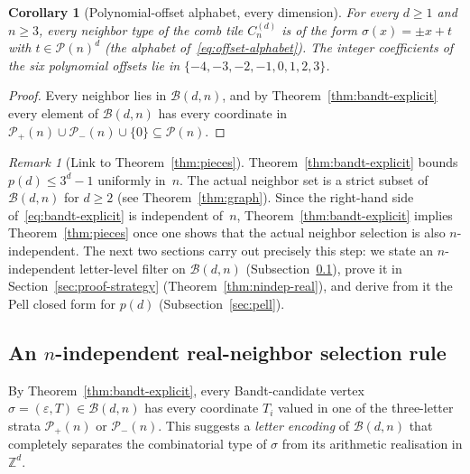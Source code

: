 \documentclass{amsart}
\newtheorem{corollary}[theorem]{Corollary}
\theoremstyle{definition}
\theoremstyle{remark}
\newtheorem{remark}[theorem]{Remark}
\newcommand{\Z}{\mathbb{Z}}
\begin{document}
\begin{corollary}[Polynomial-offset alphabet, every dimension]
\label{cor:poly-offsets}
For every $d \ge 1$ and $n \ge 3$, every neighbor type of the
comb tile $C_n^{(d)}$ is of the form $\sigma(x) = \pm x + t$
with $t \in \mathcal{P}(n)^d$ (the alphabet
of~\eqref{eq:offset-alphabet}).  The integer coefficients of
the six polynomial offsets lie in $\{-4, -3, -2, -1, 0, 1, 2, 3\}$.
\end{corollary}

\begin{proof}
Every neighbor lies in $\mathcal{B}(d, n)$, and by
Theorem~\ref{thm:bandt-explicit} every element of
$\mathcal{B}(d, n)$ has every coordinate in
$\mathcal{P}_+(n) \cup \mathcal{P}_-(n) \cup \{0\}
\subseteq \mathcal{P}(n)$.
\end{proof}

\begin{remark}[Link to Theorem~\ref{thm:pieces}]
\label{rem:bandt-link}
Theorem~\ref{thm:bandt-explicit} bounds $p(d) \le 3^d - 1$
uniformly in~$n$.  The actual neighbor set is a strict subset of
$\mathcal{B}(d, n)$ for $d \ge 2$
(see Theorem~\ref{thm:graph}).
Since the right-hand side of~\eqref{eq:bandt-explicit} is
independent of~$n$, Theorem~\ref{thm:bandt-explicit} implies
Theorem~\ref{thm:pieces} once one shows that
the actual neighbor selection is also $n$-independent.
The next two sections carry out precisely this step: we state an
$n$-independent letter-level filter on $\mathcal{B}(d, n)$
\textup{(}Subsection~\ref{sec:nindep-real}\textup{)}, prove it in
Section~\ref{sec:proof-strategy}
\textup{(}Theorem~\ref{thm:nindep-real}\textup{)},
and derive from it the Pell closed form for $p(d)$
\textup{(}Subsection~\ref{sec:pell}\textup{)}.
\end{remark}

\subsection{An $n$-independent real-neighbor selection rule}
\label{sec:nindep-real}

By Theorem~\ref{thm:bandt-explicit}, every Bandt-candidate vertex
$\sigma = (\varepsilon, T) \in \mathcal{B}(d, n)$ has every
coordinate $T_i$ valued in one of the three-letter strata
$\mathcal{P}_+(n)$ or $\mathcal{P}_-(n)$.  This suggests a
\emph{letter encoding} of $\mathcal{B}(d, n)$ that completely
separates the combinatorial type of $\sigma$ from its arithmetic
realisation in $\Z^d$.
\end{document}
